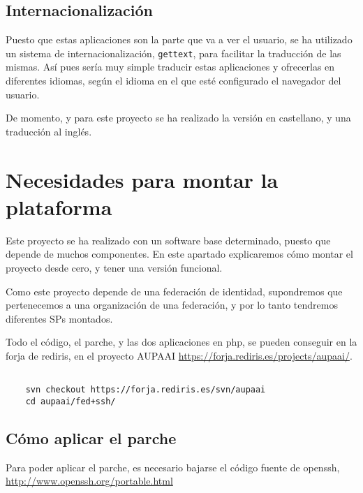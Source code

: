     \subsection{Internacionalización}

    Puesto que estas aplicaciones son la parte que va a ver el
    usuario, se ha utilizado un sistema de internacionalización,
    \texttt{gettext}, para facilitar la traducción de las mismas. Así
    pues sería muy simple traducir estas aplicaciones y ofrecerlas en
    diferentes idiomas, según el idioma en el que esté configurado el
    navegador del usuario.

    De momento, y para este proyecto se ha realizado la versión en
    castellano, y una traducción al inglés.

    \section{Necesidades para montar la plataforma}

    Este proyecto se ha realizado con un software base determinado,
    puesto que depende de muchos componentes. En este apartado
    explicaremos cómo montar el proyecto desde cero, y tener una
    versión funcional.

    Como este proyecto depende de una federación de identidad,
    supondremos que pertenecemos a una organización de una federación,
    y por lo tanto tendremos diferentes SPs montados.

    Todo el código, el parche, y las dos aplicaciones en php, se
    pueden conseguir en la forja de rediris, en el proyecto AUPAAI 
    \url{https://forja.rediris.es/projects/aupaai/}.


    \begin{verbatim}

    svn checkout https://forja.rediris.es/svn/aupaai   
    cd aupaai/fed+ssh/

    \end{verbatim}

        \subsection{Cómo aplicar el parche}

        Para poder aplicar el parche, es necesario bajarse el código
        fuente de openssh, \url{http://www.openssh.org/portable.html}

